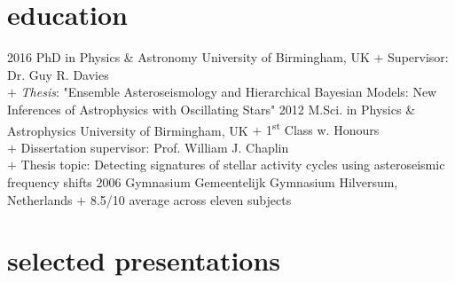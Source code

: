 \documentclass[letterpaper]{k-cv} %
\begin{document}
\section{\color{c1}education}

\begin{entrylist}
	
	\entry
	{2016 }
	{PhD {\bodyfont in Physics \& Astronomy}}
	{University of Birmingham, UK}
	{$+$ Supervisor: Dr. Guy R. Davies\\
		$+$ \textit{Thesis}: "Ensemble Asteroseismology and Hierarchical Bayesian Models: New Inferences of Astrophysics with Oscillating Stars"} 
	\entry
	{2012 }
	{M.Sci. {\bodyfont in Physics \& Astrophysics}}
	{University of Birmingham, UK}
	{$+$ 1\textsuperscript{st} Class w. Honours\\ 
		$+$ Dissertation supervisor: Prof. William J. Chaplin\\
		$+$ Thesis topic: Detecting signatures of stellar activity cycles using asteroseismic frequency shifts}
	\entry
	{2006 }
	{Gymnasium}
	{Gemeentelijk Gymnasium Hilversum, Netherlands}
	{$+$ 8.5/10 average across eleven subjects}
\end{entrylist}

\section{\color{c1}selected presentations}
\end{document}
